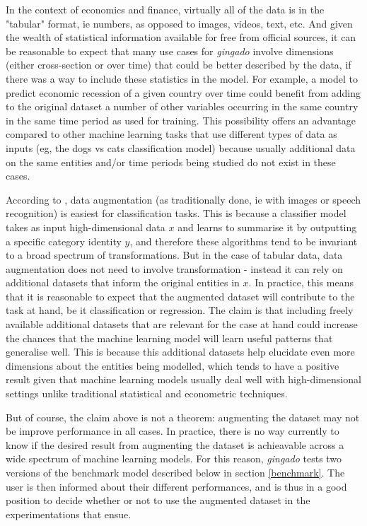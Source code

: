 \documentclass{article}
\begin{document}
In the context of economics and finance, virtually all of the data is in the "tabular" format, ie numbers, as opposed to images, videos, text, etc. And given the wealth of statistical information available for free from official sources, it can be reasonable to expect that many use cases for \textit{gingado} involve dimensions (either cross-section or over time) that could be better described by the data, if there was a way to include these statistics in the model. For example, a model to predict economic recession of a given country over time could benefit from adding to the original dataset a number of other variables occurring in the same country in the same time period as used for training. This possibility offers an advantage compared to other machine learning tasks that use different types of data as inputs (eg, the dogs vs cats classification model) because usually additional data on the same entities and/or time periods being studied do not exist in these cases.

According to \cite{DeepLearning}, data augmentation (as traditionally done, ie with images or speech recognition) is easiest for classification tasks. This is because a classifier model takes as input high-dimensional data $x$ and learns to summarise it by outputting a specific category identity $y$, and therefore these algorithms tend to be invariant to a broad spectrum of transformations. But in the case of tabular data, data augmentation does not need to involve transformation - instead it can rely on additional datasets that inform the original entities in $x$. In practice, this means that it is reasonable to expect that the augmented dataset will contribute to the task at hand, be it classification or regression. The claim is that including freely available additional datasets that are relevant for the case at hand could increase the chances that the machine learning model will learn useful patterns that generalise well. This is because this additional datasets help elucidate even more dimensions about the entities being modelled, which tends to have a positive result given that machine learning models usually deal well with high-dimensional settings unlike traditional statistical and econometric techniques. 

But of course, the claim above is not a theorem: augmenting the dataset may not be improve performance in all cases. In practice, there is no way currently to know if the desired result from augmenting the dataset is achieavable across a wide spectrum of machine learning models. For this reason, \textit{gingado} tests two versions of the benchmark model described below in section \ref{benchmark}. The user is then informed about their different performances, and is thus in a good position to decide whether or not to use the augmented dataset in the experimentations that ensue.
\end{document}
